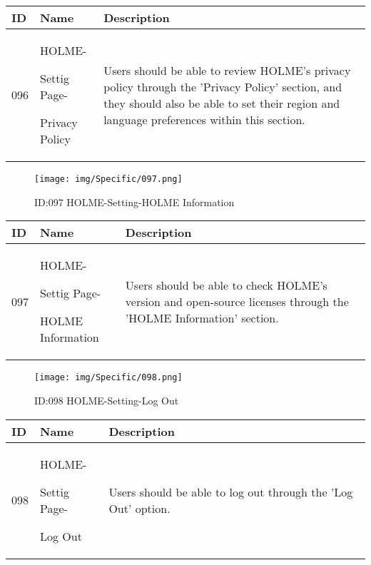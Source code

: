 \documentclass[conference]{IEEEtran}
\begin{document}
\begin{enumerate}
\begin{table}[h]
\begin{tabular}{|p{1cm}|p{1.8cm}|p{5.0cm}|}
        \hline
        ID & Name & Description\\ \hline
         096 \par  & HOLME-\par Settig Page- \par Privacy Policy& 
       	Users should be able to review HOLME's privacy policy through the 'Privacy Policy' section, and they should also be able to set their region and language preferences within this section.
         \\ \hline
    \end{tabular}
\end{table}
\begin{figure}[h]
\centering                                         
\texttt{[image: img/Specific/097.png]}
\caption{ID:097 HOLME-Setting-HOLME Information}
\end{figure}
\begin{table}[h]
\def\arraystretch{1.2} \small
    \begin{tabular}{|p{1cm}|p{1.8cm}|p{5.0cm}|}
        \hline
        ID & Name & Description\\ \hline
         097 \par  & HOLME-\par Settig Page- \par HOLME Information& 
       	Users should be able to check HOLME's version and open-source licenses through the 'HOLME Information' section.
         \\ \hline
    \end{tabular}
\end{table}
\clearpage


\begin{figure}[h]
\centering                                         
\texttt{[image: img/Specific/098.png]}
\caption{ID:098 HOLME-Setting-Log Out}
\end{figure}
\begin{table}[h]
\def\arraystretch{1.2} \small
    \begin{tabular}{|p{1cm}|p{1.8cm}|p{5.0cm}|}
        \hline
        ID & Name & Description\\ \hline
         098 \par  & HOLME-\par Settig Page- \par Log Out& 
       	Users should be able to log out through the 'Log Out' option.
         \\ \hline
    \end{tabular}
\end{table}
\end{enumerate}
\end{document}
